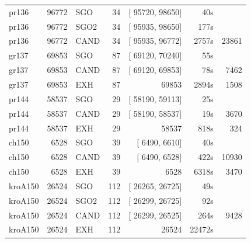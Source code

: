 \documentclass[a4paper,11pt,twoside]{book}
\begin{document}
\begin{multicols}{2}
\begin{center}
\begin{tabular}{|lrlrrrr|}
pr136        &    96772 &  SGO &  34 & [ 95720, 98650] &    40s & \\
pr136        &    96772 & SGO2 &  34 & [ 95935, 98650] &   177s & \\
pr136        &    96772 & CAND &  34 & [ 95935, 96772] &  2757s &   23861 \\
gr137        &    69853 &  SGO &  87 & [ 69120, 70240] &    55s & \\
gr137        &    69853 & CAND &  87 & [ 69120, 69853] &    78s &    7462 \\
gr137        &    69853 &  EXH &  87 &           69853 &  2894s &    1508 \\
pr144        &    58537 &  SGO &  29 & [ 58190, 59113] &    25s & \\
pr144        &    58537 & CAND &  29 & [ 58190, 58537] &    19s &    3670 \\
pr144        &    58537 &  EXH &  29 &           58537 &   818s &     324 \\
ch150        &     6528 &  SGO &  39 & [  6490,  6610] &    40s & \\
ch150        &     6528 & CAND &  39 & [  6490,  6528] &   422s &   10930 \\
ch150        &     6528 &  EXH &  39 &            6528 &  6318s &    3470 \\
kroA150      &    26524 &  SGO & 112 & [ 26265, 26725] &    49s & \\
kroA150      &    26524 & SGO2 & 112 & [ 26299, 26725] &    92s & \\
kroA150      &    26524 & CAND & 112 & [ 26299, 26525] &   264s &    9428 \\
kroA150      &    26524 &  EXH & 112 &          26524  & 22472s &     \\
\hline
\end{tabular}
\end{center}


\end{multicols}
\end{document}

